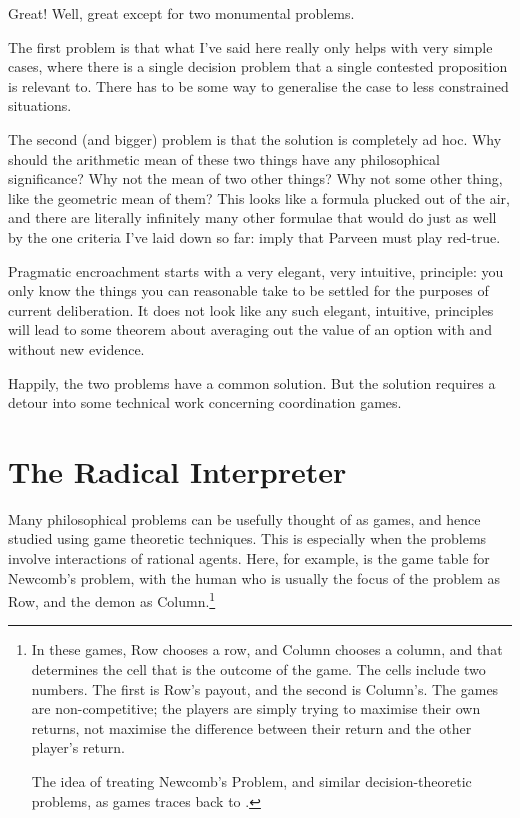 \documentclass[11pt,]{book}
\let\rmarkdownfootnote\footnote%
\def\footnote{\protect\rmarkdownfootnote}
\begin{document}
Great! Well, great except for two monumental problems.

The first problem is that what I've said here really only helps with very simple cases, where there is a single decision problem that a single contested proposition is relevant to. There has to be some way to generalise the case to less constrained situations.

The second (and bigger) problem is that the solution is completely ad hoc. Why should the arithmetic mean of these two things have any philosophical significance? Why not the mean of two other things? Why not some other thing, like the geometric mean of them? This looks like a formula plucked out of the air, and there are literally infinitely many other formulae that would do just as well by the one criteria I've laid down so far: imply that Parveen must play red-true.

Pragmatic encroachment starts with a very elegant, very intuitive, principle: you
only know the things you can reasonable take to be settled for the purposes of current deliberation. It does not look like any such elegant, intuitive, principles will lead to some theorem about averaging out the value of an option with and without new evidence.

Happily, the two problems have a common solution. But the solution requires a detour into some technical work concerning coordination games.

\hypertarget{radicalinterpretation}{%
\section{The Radical Interpreter}\label{radicalinterpretation}}

Many philosophical problems can be usefully thought of as games, and hence studied using game theoretic techniques. This is especially when the problems involve interactions of rational agents. Here, for example, is the game table for Newcomb's problem, with the human who is usually the focus of the problem as Row, and the demon as Column.\footnote{In these games, Row chooses a row, and Column chooses a column, and that determines the cell that is the outcome of the game. The cells include two numbers. The first is Row's payout, and the second is Column's. The games are non-competitive; the players are simply trying to maximise their own returns, not maximise the difference between their return and the other player's return.

  The idea of treating Newcomb's Problem, and similar decision-theoretic problems, as games traces back to \citet{Harper1986}.}
\end{document}
